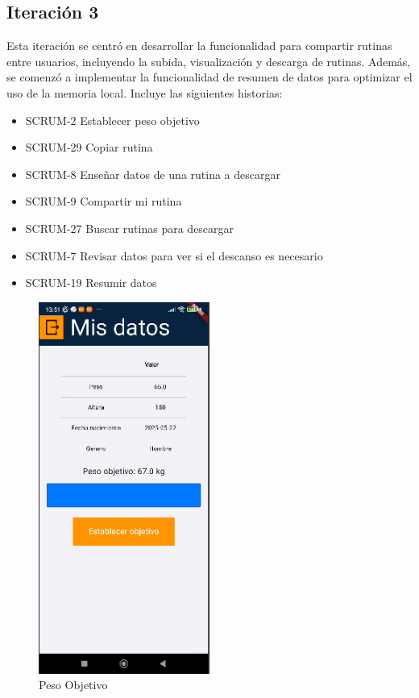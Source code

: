 \subsection{Iteración 3}
Esta iteración se centró en desarrollar la funcionalidad para compartir rutinas entre usuarios, incluyendo la subida, visualización y descarga de rutinas. Además, se comenzó a implementar la funcionalidad de resumen de datos para optimizar el uso de la memoria local. Incluye las siguientes historias:

\begin{itemize}
  \item SCRUM-2 Establecer peso objetivo
  \item SCRUM-29 Copiar rutina
  \item SCRUM-8 Enseñar datos de una rutina a descargar
  \item SCRUM-9 Compartir mi rutina
  \item SCRUM-27 Buscar rutinas para descargar
  \item SCRUM-7 Revisar datos para ver si el descanso es necesario
  \item SCRUM-19 Resumir datos
\end{itemize}


\begin{figure}[H]
   \centering
    \includegraphics[width=0.5\textwidth]{pantallas/pesoObj.png}
    \caption{Peso Objetivo}
    \label{fig:pesoObj}
\end{figure}

